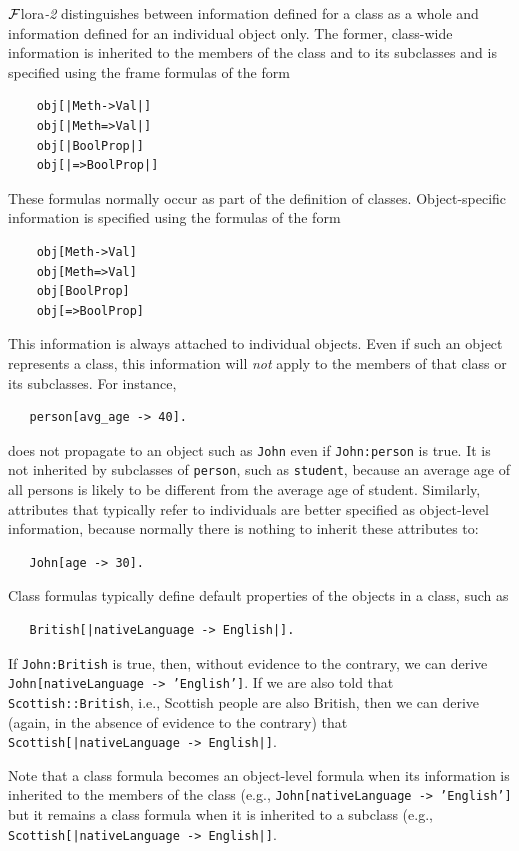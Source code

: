 \documentclass[11pt]{article}
\newcommand{\FLORA}{{\mbox{\sc ${\cal F}${lora}\rm\emph{-2}}}\xspace}
\newcommand{\FLSYSTEM}{\FLORA}
\begin{document}
\FLSYSTEM distinguishes between information defined for a class as a whole
and information defined for an individual object only.
The former, class-wide information is inherited to the members of the class and to its
subclasses and is specified using the frame formulas of the form
\begin{verbatim}
    obj[|Meth->Val|]
    obj[|Meth=>Val|]
    obj[|BoolProp|]
    obj[|=>BoolProp|]
\end{verbatim}
These formulas normally occur as part of the definition of classes.
Object-specific information is specified using the formulas of
the form
\begin{verbatim}
    obj[Meth->Val]
    obj[Meth=>Val]
    obj[BoolProp]
    obj[=>BoolProp]
\end{verbatim}
This information is always attached to individual
objects. Even if such an object represents a class, this information
will \emph{not} apply to the members of that class or its subclasses. For
instance,
\begin{verbatim}
   person[avg_age -> 40].  
\end{verbatim}
does not propagate to an object such as \texttt{John} even if
\texttt{John:person}  is true. It is not inherited by subclasses of
\texttt{person}, such as \texttt{student}, because an average age of all
persons is likely to be different from the average age of student.  
Similarly, attributes that typically refer to individuals are better
specified as object-level information, because normally there is nothing to
inherit these attributes to:
\begin{verbatim}
   John[age -> 30].  
\end{verbatim}
Class formulas typically define default properties 
of the objects in a class, such as
\begin{verbatim}
   British[|nativeLanguage -> English|].  
\end{verbatim}
If {\tt John:British} is true, then, without evidence to the contrary,
we can derive {\tt
  John[nativeLanguage -> 'English']}.
If we are also told that {\tt Scottish::British}, i.e., Scottish
  people are also British, then we can derive (again, in the absence of 
  evidence to the contrary)
  that {\tt Scottish[|nativeLanguage -> English|]}.
  
  Note that a class formula becomes an object-level formula when its
  information is inherited to the members of the class (e.g.,
  \texttt{John[nativeLanguage -> 'English']} but it remains a class formula
  when it is inherited to a subclass (e.g., \texttt{Scottish[|nativeLanguage ->
  English|]}.
\end{document}
